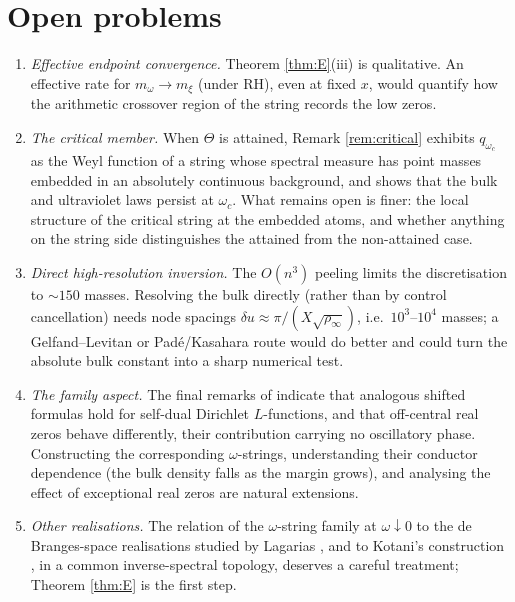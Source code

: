 \documentclass[11pt,reqno]{amsart}
\theoremstyle{plain}
\theoremstyle{definition}
\begin{document}
\section{Open problems}\label{sec:open}

\begin{enumerate}
\item \emph{Effective endpoint convergence.} Theorem \ref{thm:E}(iii) is qualitative. An
effective rate for $m_\omega\to m_\xi$ (under RH), even at fixed $x$, would quantify how the
arithmetic crossover region of the string records the low zeros.
\item \emph{The critical member.} When $\Theta$ is attained, Remark \ref{rem:critical}
exhibits $q_{\omega_c}$ as the Weyl function of a string whose spectral measure has point
masses embedded in an absolutely continuous background, and shows that the bulk and
ultraviolet laws persist at $\omega_c$. What remains open is finer: the local structure of the
critical string at the embedded atoms, and whether anything on the string side distinguishes
the attained from the non-attained case.
\item \emph{Direct high-resolution inversion.} The $O(n^3)$ peeling limits the discretisation
to $\sim150$ masses. Resolving the bulk directly (rather than by control cancellation)
needs node spacings $\delta u\approx\pi/(X\sqrt{\rho_\infty})$, i.e.\ $10^3$--$10^4$ masses; a
Gelfand--Levitan or Pad\'e/Kasahara route would do better and could turn the absolute bulk
constant into a sharp numerical test.
\item \emph{The family aspect.} The final remarks of \cite{Margin} indicate that analogous
shifted formulas hold for self-dual Dirichlet $L$-functions, and that off-central real zeros
behave differently, their contribution carrying no oscillatory phase. Constructing the
corresponding $\omega$-strings, understanding their conductor dependence (the bulk density
falls as the margin grows), and analysing the effect of exceptional real zeros are natural
extensions.
\item \emph{Other realisations.} The relation of the $\omega$-string family at $\omega\downarrow0$
to the de Branges-space realisations studied by Lagarias \cite{Lagarias2006}, and to Kotani's
construction \cite{Kotani}, in a common inverse-spectral topology, deserves a careful
treatment; Theorem \ref{thm:E} is the first step.
\end{enumerate}
\end{document}
